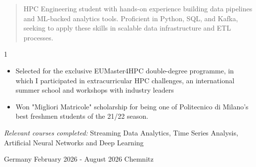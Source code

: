 \documentclass[10pt,a4paper,ragged2e,withhyper]{cv}
\begin{document}

\makecvheader
\begin{quote}
\small HPC Engineering student with hands-on experience building data pipelines and ML-backed analytics tools. Proficient in Python, SQL, and Kafka, seeking to apply these skills in scalable data infrastructure and ETL processes.
\end{quote}




\begin{paracol}{1}



        \begin{itemize}

             \item Selected for the exclusive EUMaster4HPC double-degree programme, in which I participated in extracurricular HPC challenges, an international summer school and workshops with industry leaders

          \end{itemize}

          \medskip


        \begin{itemize}

             \item Won "Migliori Matricole" scholarship for being one of Politecnico di Milano's best freshmen students of the 21/22 season.

          \end{itemize}

        \medskip

        \textit{Relevant courses completed:} {\small Streaming Data Analytics, Time Series Analysis, Artificial Neural Networks and Deep Learning}



{Germany}
{February 2026 - August 2026}
{Chemnitz}
{\footnotesize\faCode \hspace{1pt}
}


\end{paracol}
\end{document}
